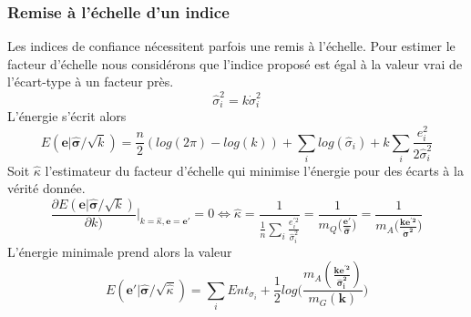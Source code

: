 \documentclass[../main/These_Mathias_Paget.tex]{subfiles}
\begin{document}
\subsubsection{Remise à l’échelle d'un indice}

Les indices de confiance nécessitent parfois une remis à l’échelle. Pour estimer le facteur d’échelle nous considérons que l'indice proposé est égal à la valeur vrai de l’écart-type à un facteur près.
\begin{equation}
 \hat{\sigma}_i^2 = k\dot{\sigma}_i^2
\end{equation}
L'énergie s'écrit alors
\begin{equation}
E(\boldsymbol{e}|\boldsymbol{\hat{\sigma}}/\sqrt{k}) = \frac{n}{2}(log(2\pi)-log(k))  + \sum_i{log(\hat{\sigma}_i)}  + k\sum_i\frac{e_i^2}{2 \hat{\sigma}_i^2}
\end{equation}
Soit $\hat{\kappa}$ l'estimateur du facteur d’échelle qui minimise l’énergie pour des écarts à la vérité donnée.
\begin{equation}
\frac{\partial E(\boldsymbol{e}|\boldsymbol{\hat{\sigma}}/\sqrt{k})}{\partial k)} \bigg|_{k=\hat{\kappa}, \boldsymbol{e} = \boldsymbol{e'}} = 0 \Leftrightarrow  \hat{\kappa} = \frac{1}{\frac{1}{n}\sum_i\frac{e_i^{'2}}{\hat{\sigma}_i^2}} = \frac{1}{m_Q \big(\frac{\boldsymbol{e'}}{\boldsymbol{\hat{\sigma}}}\big)} = \frac{1}{m_A \big(\frac{\boldsymbol{ke^{'2}}}{\boldsymbol{\dot{\sigma}^2}}\big)}
\end{equation}
L’énergie minimale prend alors la valeur
\begin{equation}
E(\boldsymbol{e'}|\boldsymbol{\hat{\sigma}}/\sqrt{\hat{\kappa}})= \sum_iEnt_{\dot{\sigma}_i} + \frac{1}{2} log \bigg(\frac{m_A(\boldsymbol{\frac{ke^{'2}}{\hat{\sigma}_i^2}})}{m_G(\boldsymbol{k})}\bigg)
\end{equation}
\end{document}
